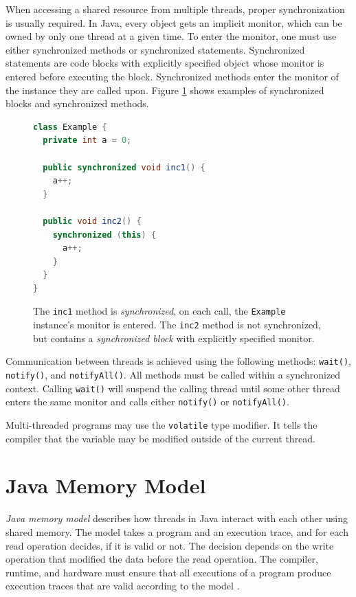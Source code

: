 When accessing a shared resource from multiple threads, proper synchronization
is usually required. In Java, every object gets an implicit monitor, which can
be owned by only one thread at a given time. To enter the monitor, one must use
either synchronized methods or synchronized statements. Synchronized statements
are code blocks with explicitly specified object whose monitor is entered before
executing the block. Synchronized methods enter the monitor of the instance they
are called upon. Figure \ref{synchronized} shows examples of synchronized blocks
and synchronized methods.

\begin{figure}[hbt]
    \label{synchronized}
\begin{lstlisting}[language=java]
class Example {
  private int a = 0;

  public synchronized void inc1() {
    a++;
  }

  public void inc2() {
    synchronized (this) {
      a++;
    }
  }
}
\end{lstlisting}
    \caption{The \texttt{inc1} method is \emph{synchronized}, on each call, the
    \texttt{Example} instance's monitor is entered. The \texttt{inc2} method is
    not synchronized, but contains a \emph{synchronized block} with explicitly
    specified monitor.}
\end{figure}

Communication between threads is achieved using the following methods:
\texttt{wait()}, \texttt{notify()}, and \texttt{notifyAll()}. All methods must
be called within a synchronized context. Calling \texttt{wait()} will suspend
the calling thread until some other thread enters the same monitor and calls
either \texttt{notify()} or \texttt{notifyAll()}.

Multi-threaded programs may use the \texttt{volatile} type modifier. It tells
the compiler that the variable may be modified outside of the current thread.

\section{Java Memory Model}


\emph{Java memory model} describes how threads in Java interact with each other
using shared memory. The model takes a program and an execution trace, and for
each read operation decides, if it is valid or not. The decision depends on the
write operation that modified the data before the read operation. The compiler,
runtime, and hardware must ensure that all executions of a program produce
execution traces that are valid according to the model \cite{jmmspec}.

